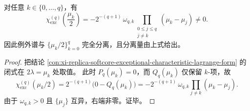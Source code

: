 \begin{conclusion}[张量谱节点处的显式避让值]\label{con:xi-replica-softcore-exceptional-node-avoidance-value}
对任意 \(k\in\{0,\dots,q\}\)，有
\[
\chi_{\mathrm{exc}}^{(q)}\!\left(\frac{\mu_k}{2}\right)
=-2^{-(q+1)}\,\omega_{q,k}\!\!\prod_{\substack{0\le j\le q\\ j\ne k}}\!(\mu_k-\mu_j)\neq 0.
\]
因此例外谱与 \(\{\mu_k/2\}_{k=0}^{q}\) 完全分离，且分离量由上式给出。
\end{conclusion}
\begin{proof}
把结论 \ref{con:xi-replica-softcore-exceptional-characteristic-lagrange-form} 的闭式在 \(2\lambda=\mu_k\) 处取值。
此时 \(P_q(\mu_k)=0\)，而 \(Q_q(\mu_k)\) 仅保留 \(k\)-项，故
\[
\chi_{\mathrm{exc}}^{(q)}(\mu_k/2)
=2^{-(q+1)}\bigl(0-Q_q(\mu_k)\bigr)
=-2^{-(q+1)}\,\omega_{q,k}\!\!\prod_{j\ne k}(\mu_k-\mu_j).
\]
由于 \(\omega_{q,k}>0\) 且 \(\{\mu_j\}\) 互异，右端非零。证毕。
\end{proof}





\endinput
